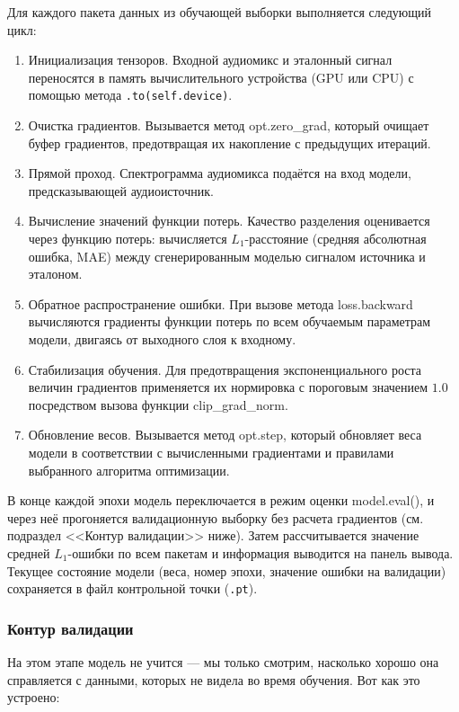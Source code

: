 \documentclass[14pt]{extarticle}
\begin{document}
Для каждого пакета данных из обучающей выборки выполняется следующий цикл:
\begin{enumerate}[label=\arabic*.]
    \item Инициализация тензоров. Входной аудиомикс и эталонный сигнал переносятся в память вычислительного устройства (GPU или CPU) с помощью метода \texttt{.to(self.device)}.
    \item Очистка градиентов. Вызывается метод opt.zero\_grad, который очищает буфер градиентов, предотвращая их накопление с предыдущих итераций.
    \item Прямой проход. Спектрограмма аудиомикса подаётся на вход модели, предсказывающей аудиоисточник.
    \item Вычисление значений функции потерь. Качество разделения оценивается через функцию потерь: вычисляется $L_1$-расстояние (средняя абсолютная ошибка, MAE) между сгенерированным моделью сигналом источника и эталоном.
    \item Обратное распространение ошибки. При вызове метода loss.backward вычисляются градиенты функции потерь по всем обучаемым параметрам модели, двигаясь от выходного слоя к входному.
    \item Стабилизация обучения. Для предотвращения экспоненциального роста величин градиентов применяется их нормировка с пороговым значением $1.0$ посредством вызова 
    функции clip\_grad\_norm.
    \item Обновление весов. Вызывается метод opt.step, который обновляет веса модели в соответствии с вычисленными градиентами и правилами выбранного алгоритма оптимизации.
\end{enumerate}

В конце каждой эпохи модель переключается в режим оценки model.eval(), и через неё прогоняется валидационную выборку без расчета градиентов 
(см. подраздел <<Контур валидации>> ниже).
Затем рассчитывается значение средней $L_1$-ошибки по всем пакетам и информация выводится на панель вывода. 
Текущее состояние модели (веса, номер эпохи, значение ошибки на валидации) сохраняется в файл контрольной точки (\texttt{.pt}).

\subsubsection{Контур валидации}
На этом этапе модель не учится --- мы только смотрим, насколько хорошо она справляется с данными, которых не видела во время обучения. Вот как это устроено:
\end{document}

